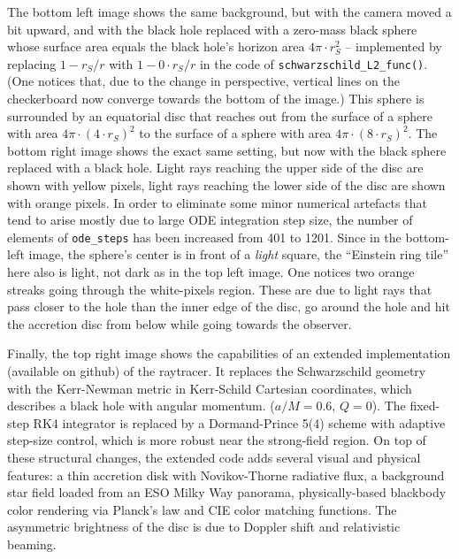 \documentclass[twocolumn]{article}
\begin{document}
The bottom left image shows the same background, but with the camera
moved a bit upward, and with the black hole replaced with a zero-mass
black sphere whose surface area equals the black hole's horizon area
$4\pi\cdot r_S^2$ -- implemented by replacing $1-r_S/r$ with $1-0\cdot
r_S/r$ in the code of \texttt{schwarzschild\_L2\_func()}. (One notices
that, due to the change in perspective, vertical lines on the
checkerboard now converge towards the bottom of the image.) This
sphere is surrounded by an equatorial disc that reaches out from the
surface of a sphere with area $4\pi\cdot\left(4\cdot r_S\right)^2$
to the surface of a sphere with area $4\pi\cdot\left(8\cdot
r_S\right)^2$. The bottom right image shows the exact same setting,
but now with the black sphere replaced with a black hole. Light rays
reaching the upper side of the disc are shown with yellow pixels,
light rays reaching the lower side of the disc are shown with orange
pixels. In order to eliminate some minor numerical artefacts that tend
to arise mostly due to large ODE integration step size, the number of
elements of \texttt{ode\_steps} has been increased from 401 to
1201. Since in the bottom-left image, the sphere's center is in front
of a \emph{light} square, the ``Einstein ring tile'' here also is
light, not dark as in the top left image. One notices two orange
streaks going through the white-pixels region. These are due to light
rays that pass closer to the hole than the inner edge of the disc, go
around the hole and hit the accretion disc from below while going
towards the observer.

Finally, the top right image shows the capabilities of an extended
implementation (available on github) of the raytracer. It replaces the
Schwarzschild geometry with the Kerr-Newman metric in Kerr-Schild
Cartesian coordinates, which describes a black hole with angular momentum.
($a/M=0.6$, $Q=0$). The fixed-step RK4 integrator is replaced by a
Dormand-Prince 5(4) scheme with adaptive step-size control, which is
more robust near the strong-field region. On top of these structural
changes, the extended code adds several visual and physical features:
a thin accretion disk with Novikov-Thorne radiative flux, a background
star field loaded from an ESO Milky Way panorama, physically-based
blackbody color rendering via Planck's law and CIE color matching
functions. The asymmetric brightness of the disc is due to Doppler
shift and relativistic beaming.
\end{document}

